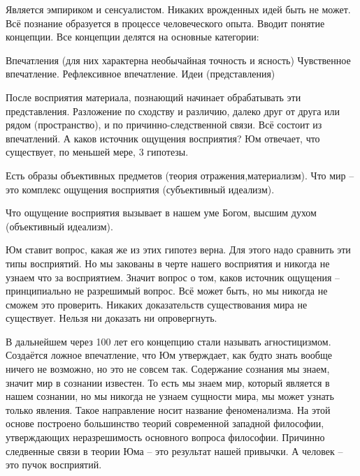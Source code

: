 Является эмпириком и сенсуалистом. Никаких врожденных идей быть не может. Всё познание образуется в процессе человеческого опыта. Вводит понятие концепции. Все концепции делятся на основные категории:

    Впечатления (для них характерна необычайная точность и ясность)
    Чувственное впечатление.
    Рефлексивное впечатление.
    Идеи (представления)

После восприятия материала, познающий начинает обрабатывать эти представления. Разложение по сходству и различию, далеко друг от друга или рядом (пространство), и по причинно-следственной связи. Всё состоит из впечатлений. А каков источник ощущения восприятия? Юм отвечает, что существует, по меньшей мере, 3 гипотезы.

    Есть образы объективных предметов (теория отражения,материализм).
    Что мир – это комплекс ощущения восприятия (субъективный идеализм).

    Что ощущение восприятия вызывает в нашем уме Богом, высшим духом (объективный идеализм).

    Юм ставит вопрос, какая же из этих гипотез верна. Для этого надо сравнить эти типы восприятий. Но мы закованы в черте нашего восприятия и никогда не узнаем что за восприятием. Значит вопрос о том, каков источник ощущения – принципиально не разрешимый вопрос. Всё может быть, но мы никогда не сможем это проверить. Никаких доказательств существования мира не существует. Нельзя ни доказать ни опровергнуть.

В дальнейшем через 100 лет его концепцию стали называть агностицизмом. Создаётся ложное впечатление, что Юм утверждает, как будто знать вообще ничего не возможно, но это не совсем так. Содержание сознания мы знаем, значит мир в сознании известен. То есть мы знаем мир, который является в нашем сознании, но мы никогда не узнаем сущности мира, мы может узнать только явления. Такое направление носит название феноменализма. На этой основе построено большинство теорий современной западной философии, утверждающих неразрешимость основного вопроса философии. Причинно следвенные связи в теории Юма – это результат нашей привычки. А человек – это пучок восприятий.
